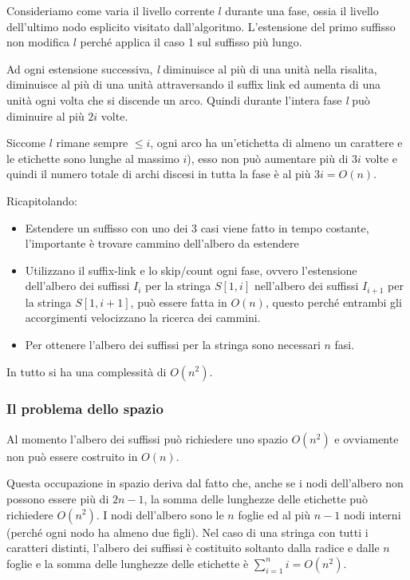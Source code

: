 Consideriamo come varia il livello corrente $l$ durante una fase, ossia il livello dell'ultimo nodo esplicito visitato dall'algoritmo.
L'estensione del primo suffisso non modifica $l$ perché applica il caso 1 sul suffisso più lungo.

Ad ogni estensione successiva, \textit{l} diminuisce al più di una unità nella risalita, diminuisce al più di una unità attraversando il suffix link ed aumenta di una unità ogni volta che si discende un arco. Quindi durante l'intera fase \textit{l} può diminuire al più $2i$ volte.

Siccome $l$ rimane sempre $\leq i$, ogni arco ha un'etichetta di almeno un carattere e le etichette sono lunghe al massimo $i$), esso non può aumentare più di $3i$ volte e quindi il numero totale di archi discesi in tutta la fase è al più $3i = O(n)$.

Ricapitolando:
\begin{itemize}
	\item Estendere un suffisso con uno dei 3 casi viene fatto in tempo costante, l'importante è trovare cammino dell'albero da estendere
	\item Utilizzano il suffix-link e lo skip/count ogni fase, ovvero l'estensione dell'albero dei suffissi $I_i$ per la stringa $S[1,i]$ nell'albero dei suffissi $I_{i+1}$ per la stringa $S[1,i+1]$, può essere fatta in $O(n)$, questo perché entrambi gli accorgimenti velocizzano la ricerca dei cammini.
	\item Per ottenere l'albero dei suffissi per la stringa sono necessari $n$ fasi.
\end{itemize}

In tutto si ha una complessità di $O(n^2)$.

\subsubsection{Il problema dello spazio}

Al momento l'albero dei suffissi può richiedere uno spazio $O(n^2)$ e ovviamente non può essere costruito in $O(n)$.

Questa occupazione in spazio deriva dal fatto che, anche se i nodi dell'albero non possono essere più di $2n-1$, la somma delle lunghezze delle etichette può richiedere $O(n^2)$. I nodi dell'albero sono le $n$ foglie ed al più $n-1$ nodi interni (perché ogni nodo ha almeno due figli). Nel caso di una stringa con tutti i caratteri distinti, l'albero dei suffissi è costituito soltanto dalla radice e dalle $n$ foglie e la somma delle lunghezze delle etichette è $\sum_{i=1}^n i = O(n^2)$.

